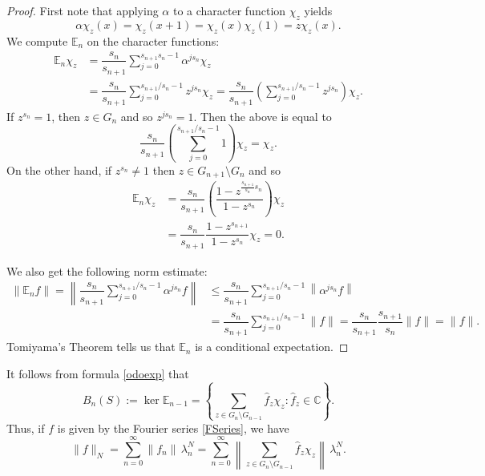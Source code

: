 \documentclass[12pt,reqno]{amsart}
\numberwithin{equation}{section}
\newcommand{\E}{{\mathbb E}}
\newcommand{\C}{{\mathbb C}}
\begin{document}
\begin{proof}
First note that applying $\alpha$ to a character function $\chi_z$ yields 
\begin{equation*}
\alpha \chi_z(x)=\chi_z(x+1) = \chi_z(x)\chi_z(1) = z\chi_z(x).
\end{equation*}
We compute $\E_n$ on the character functions:
\begin{equation*}
\begin{aligned}
\E_n\chi_z &= \dfrac{s_n}{s_{n+1}} \sum_{j=0}^{s_{n+1}{s_n}-1} \alpha^{js_n}\chi_z \\
&=\dfrac{s_n}{s_{n+1}} \sum_{j=0}^{s_{n+1}/s_n-1} z^{js_n}\chi_z = \dfrac{s_n}{s_{n+1}}\left(\sum_{j=0}^{s_{n+1}/s_n-1} z^{js_n}\right)\chi_z.
\end{aligned}
\end{equation*}
If $z^{s_n}=1$, then $z\in G_n$ and so $z^{js_n}=1$.  Then the above is equal to 
\begin{equation*}
\dfrac{s_n}{s_{n+1}} \left(\sum_{j=0}^{s_{n+1}/s_n-1} 1\right) \chi_z = \chi_z.
\end{equation*}
On the other hand, if $z^{s_n}\ne 1$ then $z\in G_{n+1}\setminus G_n$ and so
\begin{equation*}
\begin{aligned}
\E_n\chi_z &= \dfrac{s_n}{s_{n+1}} \left(\dfrac{1-z^{\frac{s_{n+1}}{s_n}s_n}}{1-z^{s_n}}\right)\chi_z \\
&= \dfrac{s_n}{s_{n+1}} \dfrac{1-z^{s_{n+1}}}{1-z^{s_n}}\chi_z = 0.
\end{aligned}
\end{equation*}

We also get the following norm estimate:
\begin{equation*}
\begin{aligned}
\|\E_nf\| = \left\| \dfrac{s_n}{s_{n+1}} \sum_{j=0}^{s_{n+1}/s_n-1} \alpha^{js_n}f\right\| &\le  \dfrac{s_n}{s_{n+1}} \sum_{j=0}^{s_{n+1}/s_n-1} \left\|\alpha^{js_n}f\right\|\\
&= \dfrac{s_n}{s_{n+1}} \sum_{j=0}^{s_{n+1}/s_n-1} \|f\| = \dfrac{s_n}{s_{n+1}} \dfrac{s_{n+1}}{s_n}\|f\| = \|f\|.
\end{aligned} 
\end{equation*}
Tomiyama's Theorem tells us that $\E_n$ is a conditional expectation.
\end{proof}

It follows from formula \eqref{odoexp} that
\begin{equation*}
B_n(S):=\ker \E_{n-1}=\left\{\sum_{z\in G_n\setminus G_{n-1}}\hat f_z \chi_z: \hat f_z\in\C\right\}.
\end{equation*}
Thus, if $f$ is given by the Fourier series \eqref{FSeries}, we have
\begin{equation*}
\|f\|_N=\sum_{n=0}^\infty \|f_n\|\,\lambda_n^N=\sum_{n=0}^\infty\left\|\sum_{z\in G_n\setminus G_{n-1}}\hat f_z \chi_z\right\|\,\lambda_n^N.
\end{equation*}
\end{document}

